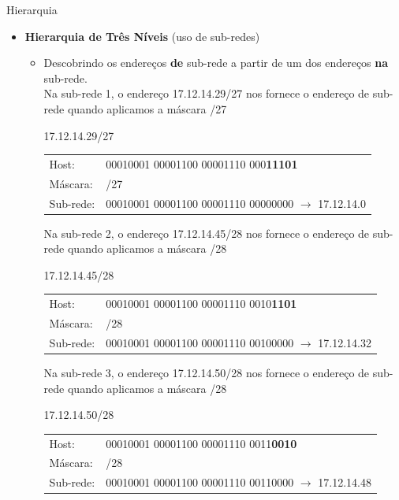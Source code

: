 \documentclass{libs/ufc_format}
\begin{document}
\begin{frame}{Hierarquia}
    \begin{itemize}
        \tiny
        \justifying
        \item \textbf{Hierarquia de Três Níveis} (uso de sub-redes)
            \begin{itemize}
                \tiny
                \justifying
                \item Descobrindo os endereços \textbf{de} sub-rede a partir de um dos endereços \textbf{na} sub-rede.\\
                Na sub-rede 1, o endereço 17.12.14.29/27 nos fornece o endereço de sub-rede quando aplicamos a máscara /27
                \begin{exampleblock}{17.12.14.29/27}
                    \begin{tabular}{l l}
                        \tiny
                        Host:       &  00010001 00001100 00001110 000\textbf{11101}\\
                        Máscara:    & /27\\
                        Sub-rede:   & 00010001 00001100 00001110 00000000 $\rightarrow$ 17.12.14.0
                    \end{tabular}
                \end{exampleblock}
                Na sub-rede 2, o endereço 17.12.14.45/28 nos fornece o endereço de sub-rede quando aplicamos a máscara /28
                \begin{exampleblock}{17.12.14.45/28}
                    \begin{tabular}{l l}
                        \tiny
                        Host:       &  00010001 00001100 00001110 0010\textbf{1101}\\
                        Máscara:    & /28\\
                        Sub-rede:   & 00010001 00001100 00001110 00100000 $\rightarrow$ 17.12.14.32
                    \end{tabular}
                \end{exampleblock}
                Na sub-rede 3, o endereço 17.12.14.50/28 nos fornece o endereço de sub-rede quando aplicamos a máscara /28
                \begin{exampleblock}{17.12.14.50/28}
                    \begin{tabular}{l l}
                        \tiny
                        Host:       &  00010001 00001100 00001110 0011\textbf{0010}\\
                        Máscara:    & /28\\
                        Sub-rede:   & 00010001 00001100 00001110 00110000 $\rightarrow$ 17.12.14.48
                    \end{tabular}
                \end{exampleblock}
            \end{itemize}
    \end{itemize}
\end{frame}
\end{document}
